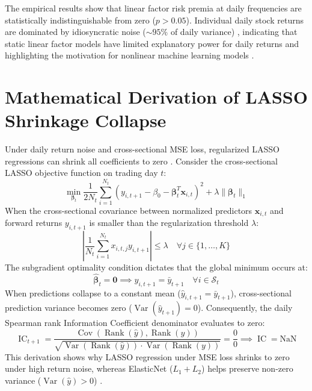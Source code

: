 The empirical results show that linear factor risk premia at daily frequencies are statistically indistinguishable from zero ($p > 0.05$). Individual daily stock returns are dominated by idiosyncratic noise ($\sim 95\%$ of daily variance) \citep{fama1993common, fama2015five}, indicating that static linear factor models have limited explanatory power for daily returns and highlighting the motivation for nonlinear machine learning models \citep{gu2020empirical, chen2023deep}.

\section{Mathematical Derivation of LASSO Shrinkage Collapse}
Under daily return noise and cross-sectional MSE loss, regularized LASSO regressions can shrink all coefficients to zero \citep{tibshirani1996regression, kozak2020shrinking}. Consider the cross-sectional LASSO objective function on trading day $t$:
\begin{equation}
\min_{\boldsymbol{\beta}_t} \frac{1}{2N_t} \sum_{i=1}^{N_t} \left( y_{i,t+1} - \beta_0 - \boldsymbol{\beta}_t^T \mathbf{x}_{i,t} \right)^2 + \lambda \|\boldsymbol{\beta}_t\|_1
\label{eq:ch5_lasso_obj}
\end{equation}
When the cross-sectional covariance between normalized predictors $\mathbf{x}_{i,t}$ and forward returns $y_{i,t+1}$ is smaller than the regularization threshold $\lambda$:
\begin{equation}
\left| \frac{1}{N_t} \sum_{i=1}^{N_t} x_{i,t,j} y_{i,t+1} \right| \le \lambda \quad \forall j \in \{1, \dots, K\}
\end{equation}
The subgradient optimality condition dictates that the global minimum occurs at:
\begin{equation}
\hat{\boldsymbol{\beta}}_t = \mathbf{0} \implies \hat{y}_{i,t+1} = \bar{y}_{t+1} \quad \forall i \in \mathcal{S}_t
\end{equation}
When predictions collapse to a constant mean ($\hat{y}_{i,t+1} = \bar{y}_{t+1}$), cross-sectional prediction variance becomes zero ($\operatorname{Var}(\hat{y}_{t+1}) = 0$). Consequently, the daily Spearman rank Information Coefficient denominator evaluates to zero:
\begin{equation}
\operatorname{IC}_{t+1} = \frac{\operatorname{Cov}(\operatorname{Rank}(\hat{y}), \operatorname{Rank}(y))}{\sqrt{\operatorname{Var}(\operatorname{Rank}(\hat{y})) \cdot \operatorname{Var}(\operatorname{Rank}(y))}} = \frac{0}{0} \implies \operatorname{IC} = \text{NaN}
\end{equation}
This derivation shows why LASSO regression under MSE loss shrinks to zero under high return noise, whereas ElasticNet ($L_1+L_2$) helps preserve non-zero variance ($\operatorname{Var}(\hat{y}) > 0$) \citep{zou2005regularization}.

